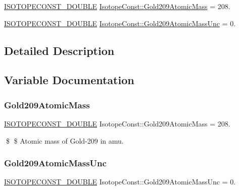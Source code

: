 \begin{DoxyCompactItemize}
\item 
\mbox{\hyperlink{group___isotope_const-_macros_ga8f45a7272ce02c0b4c65c44636ed719a}{I\+S\+O\+T\+O\+P\+E\+C\+O\+N\+S\+T\+\_\+\+D\+O\+U\+B\+LE}} \mbox{\hyperlink{group___isotope_const-_gold-_au209_ga26a0b6a8d5becd9c6e627132d6eb5d18}{Isotope\+Const\+::\+Gold209\+Atomic\+Mass}} = 208.
\item 
\mbox{\hyperlink{group___isotope_const-_macros_ga8f45a7272ce02c0b4c65c44636ed719a}{I\+S\+O\+T\+O\+P\+E\+C\+O\+N\+S\+T\+\_\+\+D\+O\+U\+B\+LE}} \mbox{\hyperlink{group___isotope_const-_gold-_au209_gad9dc2fc00c339dd91fa04b415849e10f}{Isotope\+Const\+::\+Gold209\+Atomic\+Mass\+Unc}} = 0.
\end{DoxyCompactItemize}


\subsection{Detailed Description}


\subsection{Variable Documentation}
\mbox{\label{group___isotope_const-_gold-_au209_ga26a0b6a8d5becd9c6e627132d6eb5d18}} 
\subsubsection{\texorpdfstring{Gold209\+Atomic\+Mass}{Gold209AtomicMass}}
{\footnotesize\ttfamily \mbox{\hyperlink{group___isotope_const-_macros_ga8f45a7272ce02c0b4c65c44636ed719a}{I\+S\+O\+T\+O\+P\+E\+C\+O\+N\+S\+T\+\_\+\+D\+O\+U\+B\+LE}} Isotope\+Const\+::\+Gold209\+Atomic\+Mass = 208.}

\$ \$ Atomic mass of Gold-\/209 in amu. \mbox{\label{group___isotope_const-_gold-_au209_gad9dc2fc00c339dd91fa04b415849e10f}} 
\subsubsection{\texorpdfstring{Gold209\+Atomic\+Mass\+Unc}{Gold209AtomicMassUnc}}
{\footnotesize\ttfamily \mbox{\hyperlink{group___isotope_const-_macros_ga8f45a7272ce02c0b4c65c44636ed719a}{I\+S\+O\+T\+O\+P\+E\+C\+O\+N\+S\+T\+\_\+\+D\+O\+U\+B\+LE}} Isotope\+Const\+::\+Gold209\+Atomic\+Mass\+Unc = 0.}

